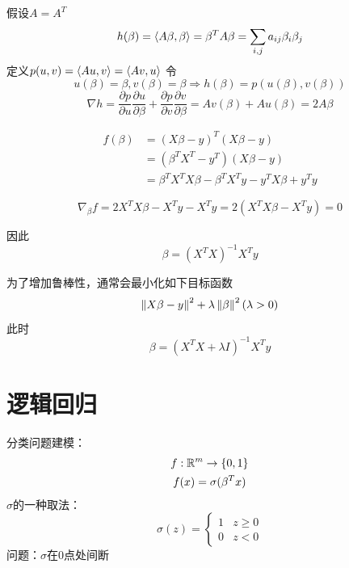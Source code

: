 \documentclass[11pt]{article}
\begin{document}
假设\(A=A^T\)
\begin{equation*}
h(\beta)=\langle A\beta,\beta\rangle=\beta^TA\beta=\sum_{i,j}a_{ij}\beta_i\beta_j
\end{equation*}
定义\(p(u,v)=\langle Au,v\rangle=\langle Av,u\rangle\)
令
\begin{equation*}
u(\beta)=\beta,v(\beta)=\beta\Rightarrow h(\beta)=p(u(\beta),v(\beta))
\end{equation*}
\begin{equation*}
\nabla h=\frac{\partial p}{\partial u}\frac{\partial u}{\partial\beta}+\frac{\partial p}{\partial v}\frac{\partial v}{\partial \beta}=Av(\beta)+Au(\beta)=2A\beta
\end{equation*}

\begin{align*}
f(\beta)&=(X\beta-y)^T(X\beta-y)\\
&=(\beta^TX^T-y^T)(X\beta-y)\\
&=\beta^TX^TX\beta-\beta^TX^Ty-y^TX\beta+y^Ty
\end{align*}

\begin{equation*}
\nabla_\beta f=2X^TX\beta-X^Ty-X^Ty=2(X^TX\beta-X^Ty)=0
\end{equation*}

因此
\begin{equation*}
\beta=(X^TX)^{-1}X^Ty
\end{equation*}

为了增加鲁棒性，通常会最小化如下目标函数
\begin{equation*}
\left\lVert X\beta-y\right\rVert^2+\lambda\left\lVert\beta\right\rVert^2(\lambda>0)
\end{equation*}
此时
\begin{equation*}
\beta=(X^TX+\lambda I)^{-1}X^Ty
\end{equation*}

\section{逻辑回归}
\label{sec:orgf56edb9}
分类问题建模：
\begin{gather*}
f:\mathbb{R}^m\to\{0,1\}\\
f(x)=\sigma(\beta^Tx)
\end{gather*}
\(\sigma\)的一种取法：
\begin{equation*}
\sigma(z)=
\begin{cases}
1&z\ge 0\\
0&z<0
\end{cases}
\end{equation*}
问题：\(\sigma\)在0点处间断
\end{document}
